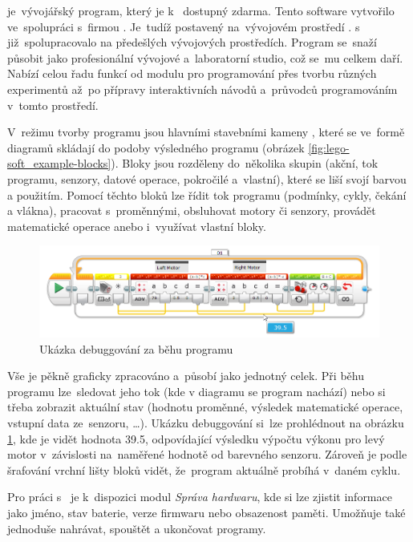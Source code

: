 \legoSW{} je~vývojářský program, který je k~\EVthree{} dostupný zdarma. 
Tento  software vytvořilo \lego{} ve~spolupráci s~firmou \NI{}. 
Je~tudíž postavený na~vývojovém prostředí \labview{}. 
\lego{} s~\NI{} již~spolupracovalo na předešlých vývojových prostředích. 
Program se~snaží působit jako profesionální vývojové a~laboratorní studio, což se~mu celkem daří.
Nabízí celou řadu funkcí od modulu pro programování přes tvorbu různých experimentů až~po přípravy interaktivních návodů a~průvodců programováním v~tomto prostředí.

V~režimu tvorby programu jsou hlavními stavebními kameny \EVblocks, které se ve~formě diagramů skládají do podoby výsledného programu (obrázek \ref{fig:lego-soft_example-blocks}).
Bloky jsou rozděleny do~několika skupin (akční, tok programu, senzory, datové operace, pokročilé a~vlastní), které se liší svojí barvou a použitím. 
Pomocí těchto bloků lze řídit tok programu (podmínky, cykly, čekání a vlákna), pracovat s~proměnnými, obsluhovat motory či senzory, provádět matematické operace anebo i~využívat vlastní bloky.

\begin{figure}[h]
	\centering
	\includegraphics[width=\textwidth]{images/lego-soft_live-debugging_line-advance.png}
	\caption{Ukázka debuggování za běhu programu}
	\label{fig:lego-soft_live-debugging_line-advance}
\end{figure}

Vše je pěkně graficky zpracováno a~působí jako jednotný celek. 
Při běhu programu lze~sledovat jeho tok (kde v diagramu se program nachází) nebo si třeba zobrazit aktuální stav (hodnotu proměnné, výsledek matematické operace, vstupní data ze~senzoru, \dots). 
Ukázku debuggování si~lze prohlédnout na obrázku \ref{fig:lego-soft_live-debugging_line-advance}, kde je vidět hodnota 39.5, odpovídající výsledku výpočtu výkonu pro levý motor v~závislosti na~naměřené hodnotě od barevného senzoru.
Zároveň je podle šrafování vrchní lišty bloků vidět, že~program aktuálně probíhá v~daném cyklu.

Pro práci s~ je k~dispozici modul {\it Správa hardwaru}, kde si lze zjistit informace jako jméno, stav baterie, verze firmwaru nebo obsazenost paměti. 
Umožňuje také jednoduše nahrávat, spouštět a ukončovat programy. 

